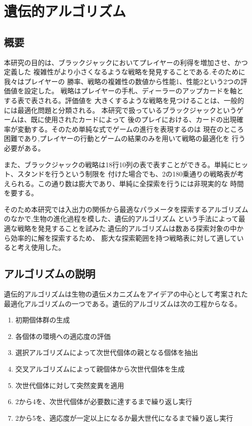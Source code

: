 \section{遺伝的アルゴリズム}
\subsection{概要}
本研究の目的は、ブラックジャックにおいてプレイヤーの利得を増加させ、かつ定義した
複雑性がより小さくなるような戦略を発見することである.そのために我々はプレイヤーの
勝率、戦略の複雑性の数値から性能1、性能2という2つの評価値を設定した。
戦略はプレイヤーの手札、ディーラーのアップカードを軸とする表で表される。評価値を
大きくするような戦略を見つけることは、一般的には最適化問題と分類される。
本研究で扱っているブラックジャックというゲームは、既に使用されたカードによって
後のプレイにおける、カードの出現確率が変動する。そのため単純な式でゲームの進行を表現するのは
現在のところ困難であり,プレイヤーの行動とゲームの結果のみを用いて戦略の最適化を
行う必要がある。

また、ブラックジャックの戦略は18行10列の表で表すことができる。単純にヒット、スタンドを行うという制限を
付けた場合でも、2の180乗通りの戦略表が考えられる。この通り数は膨大であり、単純に全探索を行うには非現実的な
時間を要する。

そのため本研究では入出力の関係から最適なパラメータを探索するアルゴリズムのなかで,生物の進化過程を模した、遺伝的アルゴリズム
という手法によって最適な戦略を発見することを試みた.遺伝的アルゴリズムは数ある探索対象の中から効率的に解を探索するため、
膨大な探索範囲を持つ戦略表に対して適していると考え使用した。

\subsection{アルゴリズムの説明}
遺伝的アルゴリズムは生物の遺伝メカニズムをアイデアの中心として考案された最適化アルゴリズムの一つである。遺伝的アルゴリズムは次の工程からなる。
  \begin {enumerate}
    \item 初期個体群の生成
    \item 各個体の環境への適応度の評価
    \item 選択アルゴリズムによって次世代個体の親となる個体を抽出
    \item 交叉アルゴリズムによって親個体から次世代個体を生成
    \item 次世代個体に対して突然変異を適用
    \item 2から4を、次世代個体が必要数に達するまで繰り返し実行
    \item 2から5を、適応度が一定以上になるか最大世代になるまで繰り返し実行
  \end {enumerate}

